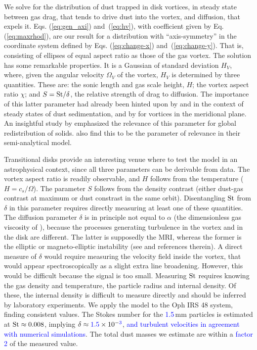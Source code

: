 \documentclass[apj]{emulateapj}
\def\blue#1{\textcolor{blue}{ #1}}
\newcommand{\Eq}[1]{Eq. (\ref{#1})}
\newcommand{\Eqs}[2]{Eqs. (\ref{#1}) and~(\ref{#2})}
\newcommand{\eq}[1]{\Eq{#1}}
\newcommand{\eqs}[2]{\Eqs{#1}{#2}}
\newcommand{\St}{{\rm St}}
\begin{document}
We solve for the distribution of dust trapped in
disk vortices, in steady state between gas drag, that 
tends to drive dust into the vortex, and diffusion, that expels
it. \eqs{eq:gen_axi}{eq:hv}, with coefficient given by \eq{eq:maxrhod},
 are our result for a distribution with
``axis-symmetry''  in the coordinate system defined by
\eqs{eq:change-x}{eq:change-y}. That is, consisting of ellipses of
equal aspect ratio as those of the gas vortex. The solution has some remarkable
properties. It is a Gaussian of standard deviation $H_V$, where, given
the angular velocity $\varOmega_V$ of the vortex, $H_V$
is determined by three quantities. These are: 
the sonic length and gas scale height, $H$; the vortex aspect ratio
$\chi$; and $S=\St/\delta$, the relative strength of drag to
diffusion. The importance of this latter parameter had already been 
hinted upon by \citet{Cuzzi93} and \citet{Dubrulle95} 
in the context of steady states of dust sedimentation, and by
\citet{Klahr-Henning97} for vortices in the meridional plane. An insightful study by 
\citet{Jacquet12} emphasized the relevance of this parameter for 
global redistribution of solids. \citet{Birnstiel13} also find this to be 
the parameter of relevance in their semi-analytical model. 

Transitional disks provide an interesting venue where to test the
model in an astrophysical context, since all three parameters can be
derivable from data. The vortex aspect ratio is readily observable,
and $H$ follows from the temperature ($H=c_s/\varOmega$). The 
parameter $S$ follows from the density contrast (either dust-gas
contrast at maximum or dust constrast in the same
orbit). Disentangling $\St$ from $\delta$ in this parameter requires
directly measuring at least one of these quantities. The diffusion
parameter $\delta$ is in principle not equal to
$\alpha$ (the dimensionless gas viscosity of
\citealt{Shakura-Sunyaev73}), because the processes generating turbulence in the
vortex and in the disk are different. The latter is supposedly the MRI, whereas the former is the elliptic or
magneto-elliptic instability (see \citealt{Lyra13} and references
therein). A direct measure of $\delta$ would require measuring the
velocity field inside the vortex, that would appear spectroscopically 
as a slight extra line broadening. However, this would be
difficult because the signal is too small. Measuring $\St$ requires
knowing the gas density and temperature, the particle radius and
internal density. Of these, the internal density is difficult to measure
directly and should be inferred by laboratory experiments. We apply
the model to the Oph IRS 48 system, finding consistent values. The
Stokes number for the \blue{1.5}\,mm particles is estimated at
\blue{$\St \approx 0.008$}, implying 
$\delta \approx \blue{1.5}\times 10^{-\blue{3}}$, \blue{and turbulent velocities in 
agreement with numerical simulations}. The total dust masses we estimate 
are within a \blue{factor 2} of the measured value. 
\end{document}
